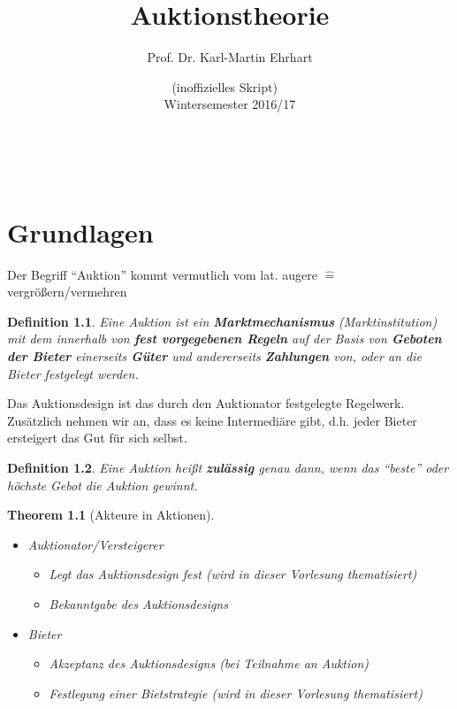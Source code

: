 \documentclass[12pt]{extreport} %
\title{Auktionstheorie}
\author{Prof. Dr. Karl-Martin Ehrhart}
\date{(inoffizielles Skript) ~\vspace{0.2cm} \\ Wintersemester 2016/17}
\makeatletter
\theoremstyle{named}
\newtheorem*{unnamedtheorem*}{Theorem}
\theoremstyle{itshape}
\newtheorem*{definition}{Definition}
\theoremstyle{normal}
\def\maketitle{ \begin{titlepage} 
			~\vspace{3cm} 
		\begin{center} {\Huge \@title} \end{center} 
	 		\vspace*{1cm} 
	 	\begin{center} {\large \@author} \end{center} 
	 	\begin{center} \@date \end{center} 
	 		\vspace*{7cm} 
	 	\begin{center} \@publishers \end{center} 
	 		\vfill 
	\end{titlepage} }
\makeatother
\begin{document}
\begin{titlepage}
	\maketitle
	\thispagestyle{empty}
\end{titlepage}
	
\tableofcontents
\thispagestyle{empty} 
  
\chapter{Grundlagen}

Der Begriff \enquote{Auktion} kommt vermutlich vom lat. augere $\hat=$ vergrößern/vermehren

\begin{definition}
	Eine Auktion ist ein \textbf{Marktmechanismus} (Marktinstitution) mit dem innerhalb von \textbf{fest vorgegebenen Regeln} auf der Basis von \textbf{Geboten der Bieter} einerseits \textbf{Güter} und andererseits \textbf{Zahlungen} von, oder an die Bieter festgelegt werden.
\end{definition}

Das Auktionsdesign ist das durch den Auktionator festgelegte Regelwerk. Zusätzlich nehmen wir an, dass es keine Intermediäre gibt, d.h. jeder Bieter ersteigert das Gut für sich selbst.

 
\begin{definition}
	Eine Auktion heißt \textbf{zulässig} genau dann, wenn das \enquote{beste} oder höchste Gebot die Auktion gewinnt.
\end{definition}

 
\begin{unnamedtheorem*}[Akteure in Aktionen] ~\
	\begin{itemize}
		\item Auktionator/Versteigerer
			\begin{itemize}
				\item Legt das Auktionsdesign fest (wird in dieser Vorlesung thematisiert)
				\item Bekanntgabe des Auktionsdesigns
			\end{itemize}
		\item Bieter
			\begin{itemize}
				\item Akzeptanz des Auktionsdesigns (bei Teilnahme an Auktion)
				\item Festlegung einer Bietstrategie (wird in dieser Vorlesung thematisiert)
			\end{itemize}
	\end{itemize} 
\end{unnamedtheorem*}
\end{document}
